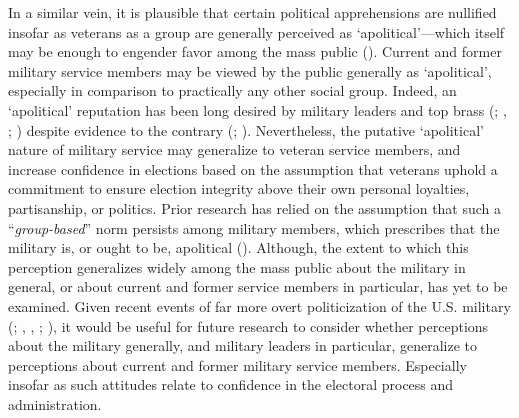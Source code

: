 \documentclass[
  12pt,
  letterpaper,
]{article}
\begin{document}
In a similar vein, it is plausible that certain political apprehensions
are nullified insofar as veterans as a group are generally perceived as
`apolitical'---which itself may be enough to engender favor among the
mass public ().
Current and former military service members may be viewed by the public
generally as `apolitical', especially in comparison to practically any
other social group. Indeed, an `apolitical' reputation has been long
desired by military leaders and top brass (; ,
; ) despite evidence to the contrary
(;
). Nevertheless, the putative
`apolitical' nature of military service may generalize to veteran
service members, and increase confidence in elections based on the
assumption that veterans uphold a commitment to ensure election
integrity above their own personal loyalties, partisanship, or politics.
Prior research has relied on the assumption that such a
``\emph{group-based}'' norm persists among military members, which
prescribes that the military is, or ought to be, apolitical
(). Although, the
extent to which this perception generalizes widely among the mass public
about the military in general, or about current and former service
members in particular, has yet to be examined. Given recent events of
far more overt politicization of the U.S. military
(;
,
, ;
), it would be useful for future
research to consider whether perceptions about the military generally,
and military leaders in particular, generalize to perceptions about
current and former military service members. Especially insofar as such
attitudes relate to confidence in the electoral process and
administration.
\end{document}
